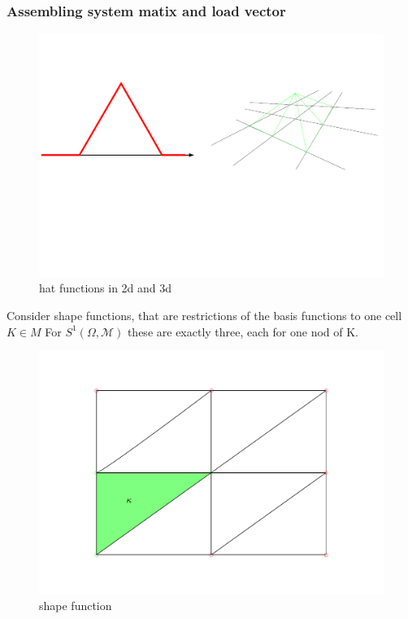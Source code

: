 \documentclass[english]{article}
\theoremstyle{definition}
\theoremstyle{remark}
\newcommand{\M}{\mathcal{M}}
\newcommand{\OO}{\Omega}
\begin{document}
\subsubsection{Assembling system matix and load vector}
\begin{figure}[H]
  \begin{center}
    \includegraphics[width=\textwidth]{figs/hatFunction.pdf}
  \end{center}
  \caption{hat functions in 2d and 3d}
  \label{hat-functions-figure}
\end{figure}

Consider shape functions, that are restrictions of the basis functions to one cell $K \in M$ For $S^1(\OO,\M)$ these are exactly three, each for one nod of K. 
\begin{figure}[H]
  \begin{center}
    \includegraphics[width=\textwidth]{figs/shapeFunctions.pdf}
  \end{center}
  \caption{shape function}
  \label{shape-function-figure}
\end{figure}
\end{document}
